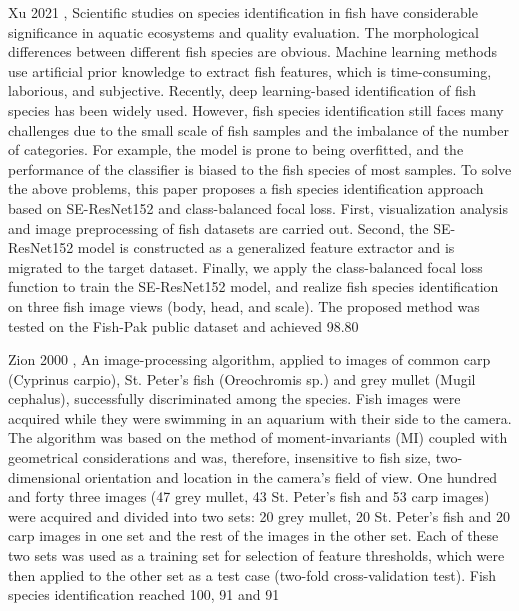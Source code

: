 Xu 2021 \cite{Xu2021TransferLA},
Scientific studies on species identification in fish have considerable significance in aquatic ecosystems and quality evaluation. The morphological differences between different fish species are obvious. Machine learning methods use artificial prior knowledge to extract fish features, which is time-consuming, laborious, and subjective. Recently, deep learning-based identification of fish species has been widely used. However, fish species identification still faces many challenges due to the small scale of fish samples and the imbalance of the number of categories. For example, the model is prone to being overfitted, and the performance of the classifier is biased to the fish species of most samples. To solve the above problems, this paper proposes a fish species identification approach based on SE-ResNet152 and class-balanced focal loss. First, visualization analysis and image preprocessing of fish datasets are carried out. Second, the SE-ResNet152 model is constructed as a generalized feature extractor and is migrated to the target dataset. Finally, we apply the class-balanced focal loss function to train the SE-ResNet152 model, and realize fish species identification on three fish image views (body, head, and scale). The proposed method was tested on the Fish-Pak public dataset and achieved 98.80%

Zion 2000 \cite{Zion2000InvivoFS},
An image-processing algorithm, applied to images of common carp (Cyprinus carpio), St. Peter’s fish (Oreochromis sp.) and grey mullet (Mugil cephalus), successfully discriminated among the species. Fish images were acquired while they were swimming in an aquarium with their side to the camera. The algorithm was based on the method of moment-invariants (MI) coupled with geometrical considerations and was, therefore, insensitive to fish size, two-dimensional orientation and location in the camera’s field of view. One hundred and forty three images (47 grey mullet, 43 St. Peter’s fish and 53 carp images) were acquired and divided into two sets: 20 grey mullet, 20 St. Peter’s fish and 20 carp images in one set and the rest of the images in the other set. Each of these two sets was used as a training set for selection of feature thresholds, which were then applied to the other set as a test case (two-fold cross-validation test). Fish species identification reached 100, 91 and 91%

